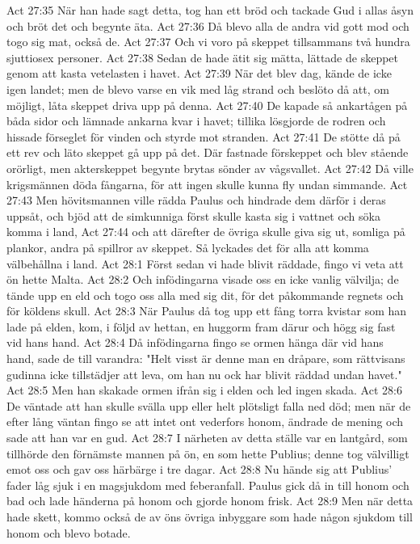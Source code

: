 Act 27:35  När han hade sagt detta, tog han ett bröd och tackade Gud i allas åsyn och bröt det och begynte äta.
Act 27:36  Då blevo alla de andra vid gott mod och togo sig mat, också de.
Act 27:37  Och vi voro på skeppet tillsammans två hundra sjuttiosex personer.
Act 27:38  Sedan de hade ätit sig mätta, lättade de skeppet genom att kasta vetelasten i havet.
Act 27:39  När det blev dag, kände de icke igen landet; men de blevo varse en vik med låg strand och beslöto då att, om möjligt, låta skeppet driva upp på denna.
Act 27:40  De kapade så ankartågen på båda sidor och lämnade ankarna kvar i havet; tillika lösgjorde de rodren och hissade förseglet för vinden och styrde mot stranden.
Act 27:41  De stötte då på ett rev och läto skeppet gå upp på det. Där fastnade förskeppet och blev stående orörligt, men akterskeppet begynte brytas sönder av vågsvallet.
Act 27:42  Då ville krigsmännen döda fångarna, för att ingen skulle kunna fly undan simmande.
Act 27:43  Men hövitsmannen ville rädda Paulus och hindrade dem därför i deras uppsåt, och bjöd att de simkunniga först skulle kasta sig i vattnet och söka komma i land,
Act 27:44  och att därefter de övriga skulle giva sig ut, somliga på plankor, andra på spillror av skeppet. Så lyckades det för alla att komma välbehållna i land.
Act 28:1  Först sedan vi hade blivit räddade, fingo vi veta att ön hette Malta.
Act 28:2  Och infödingarna visade oss en icke vanlig välvilja; de tände upp en eld och togo oss alla med sig dit, för det påkommande regnets och för köldens skull.
Act 28:3  När Paulus då tog upp ett fång torra kvistar som han lade på elden, kom, i följd av hettan, en huggorm fram därur och högg sig fast vid hans hand.
Act 28:4  Då infödingarna fingo se ormen hänga där vid hans hand, sade de till varandra: "Helt visst är denne man en dråpare, som rättvisans gudinna icke tillstädjer att leva, om han nu ock har blivit räddad undan havet."
Act 28:5  Men han skakade ormen ifrån sig i elden och led ingen skada.
Act 28:6  De väntade att han skulle svälla upp eller helt plötsligt falla ned död; men när de efter lång väntan fingo se att intet ont vederfors honom, ändrade de mening och sade att han var en gud.
Act 28:7  I närheten av detta ställe var en lantgård, som tillhörde den förnämste mannen på ön, en som hette Publius; denne tog välvilligt emot oss och gav oss härbärge i tre dagar.
Act 28:8  Nu hände sig att Publius' fader låg sjuk i en magsjukdom med feberanfall. Paulus gick då in till honom och bad och lade händerna på honom och gjorde honom frisk.
Act 28:9  Men när detta hade skett, kommo också de av öns övriga inbyggare som hade någon sjukdom till honom och blevo botade.

